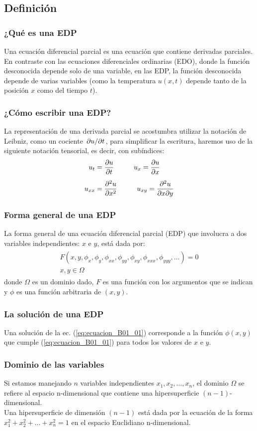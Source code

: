 \documentclass[12pt]{beamer}
\begin{document}
\subsection{Definición}
\begin{frame}
\frametitle{¿Qué es una EDP}
Una ecuación diferencial parcial es una ecuación que contiene derivadas parciales.
\\
\bigskip
\pause
En contraste con las ecuaciones diferenciales ordinarias (EDO), donde la función desconocida depende solo de una variable, en las EDP, la función desconocida depende de varias variables (como la temperatura $u (x, t)$ depende tanto de la posición $x$ como del tiempo $t$).
\end{frame}
\begin{frame}
\frametitle{¿Cómo escribir una EDP?}
La representación de una derivada parcial se acostumbra utilizar la notación de Leibniz, como un cociente $\pdv*{u}{t}$, para simplificar la escritura, haremos uso de la siguiente notación tensorial, es decir, con subíndices:
\begin{align*}
u_{t} &= \pdv{u}{t} \hspace{1cm} u_{x} = \pdv{u}{x} \\[0.5em]
u_{xx} &= \pdv[2]{u}{x} \hspace{1cm} u_{xy} = \pdv[2]{u}{x}{y}
\end{align*}
\end{frame}
\begin{frame}
\frametitle{Forma general de una EDP}
La forma general de una ecuación diferencial parcial (EDP) que involucra a dos variables independientes: $x$ e $y$, está dada por:
\pause
\begin{align}
\begin{aligned}
F(x, y, \phi_{x}, \phi_{y}, \phi_{xx}, \phi_{yy}, \phi_{xy}, \phi_{xxx}, \phi_{yyy}, \ldots) = 0 \\[0.5em]
 x, y \in \Omega
\end{aligned}
\label{eq:ecuacion_B01_01}
\end{align}
donde $\Omega$ es un dominio dado, $F$ es una función con los argumentos que se indican y $\phi$ es una función arbitraria de $(x, y)$.
\end{frame}
\begin{frame}
\frametitle{La solución de una EDP}
Una solución de la ec. (\ref{eq:ecuacion_B01_01}) corresponde a la función $\phi(x, y)$ que cumple (\ref{eq:ecuacion_B01_01}) para todos los valores de $x$ e $y$.
\end{frame}
\begin{frame}
\frametitle{Dominio de las variables}
Si estamos manejando $n$ variables independientes $x_{1}, x_{2}, \ldots, x_{n}$, el dominio $\Omega$ se refiere al espacio n-dimensional que contiene una hipersuperficie $(n-1)$-dimensional.
\\
\bigskip
\pause
Una hipersuperficie de dimensión $(n-1)$ está dada por la ecuación de la forma $x_{1}^{2} + x_{2}^{2} + \ldots + x_{n}^{2} = 1$ en el espacio Euclidiano n-dimensional.
\end{frame}
\end{document}
